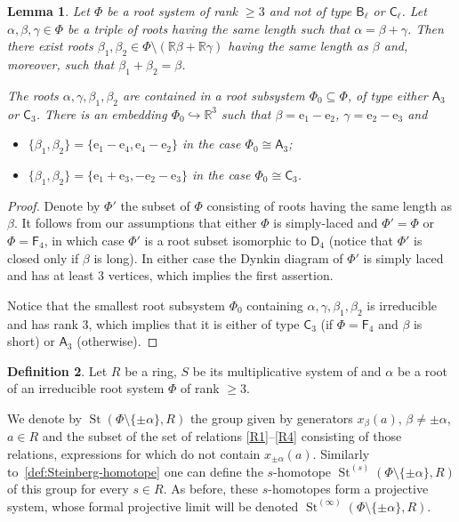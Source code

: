 \documentclass{article}
\numberwithin{equation}{section}
\newtheorem{lemma}{Lemma} \numberwithin{lemma}{section}
\theoremstyle{definition}
\newtheorem{df}[lemma]{Definition} \Crefname{df}{Definition}{Definitions}
\theoremstyle{remark}
\DeclareMathOperator\St{St}
\newcommand{\rA}{\mathsf{A}}
\newcommand{\rB}{\mathsf{B}}
\newcommand{\rC}{\mathsf{C}}
\newcommand{\rD}{\mathsf{D}}
\newcommand{\rF}{\mathsf{F}}
\begin{document}
\begin{lemma}\label{ThreeRoots}
Let \(\Phi\) be a root system of rank \(\geq 3\) and not of type \(\rB_\ell\) or \(\rC_\ell\). Let \(\alpha, \beta, \gamma \in \Phi\) be a triple of roots having the same length such that $\alpha = \beta + \gamma$.  
Then there exist roots \(\beta_1, \beta_2 \in \Phi \setminus (\mathbb R\beta + \mathbb R\gamma)\) having the same length as $\beta$ and, moreover, such that \(\beta_1 + \beta_2 = \beta\).

The roots $\alpha, \gamma, \beta_1, \beta_2$ are contained in a root subsystem $\Phi_0 \subseteq \Phi$, of type either \(\rA_3\) or \(\rC_3\). There is an embedding \(\Phi_0 \hookrightarrow  \mathbb R^3\) such that \(\beta = \mathrm e_1 - \mathrm e_2\), \(\gamma = \mathrm e_2 - \mathrm e_3\) and 
\begin{itemize}
 \item \(\{\beta_1, \beta_2\} = \{\mathrm e_1 - \mathrm e_4, \mathrm e_4 - \mathrm e_2\}\) in the case \(\Phi_0\cong\rA_3\);
 \item \(\{\beta_1, \beta_2\} = \{\mathrm e_1 + \mathrm e_3, -\mathrm e_2 - \mathrm e_3\}\) in the case \(\Phi_0\cong\rC_3\).
\end{itemize}
\end{lemma}
\begin{proof}
Denote by $\Phi'$ the subset of $\Phi$ consisting of roots having the same length as $\beta$.
It follows from our assumptions that either $\Phi$ is simply-laced and $\Phi' = \Phi$ or $\Phi = \rF_4$, in which case $\Phi'$ is a root subset isomorphic to $\rD_4$ (notice that $\Phi'$ is closed only if $\beta$ is long). In either case the Dynkin diagram of $\Phi'$ is simply laced and has at least $3$ vertices, which implies the first assertion.

Notice that the smallest root subsystem $\Phi_0$ containing $\alpha, \gamma, \beta_1, \beta_2$ is irreducible and has rank $3$, which implies that it is either of type  $\rC_3$ (if $\Phi = \rF_4$ and $\beta$ is short) or $\rA_3$ (otherwise). \end{proof}

\begin{df}
Let $R$ be a ring, $S$ be its multiplicative system of and $\alpha$ be a root of an irreducible root system $\Phi$ of rank $\geq 3$. 

We denote by $\St(\Phi\setminus\{\pm \alpha\}, R)$ the group given by generators $x_\beta(a)$, $\beta \neq \pm \alpha$, $a\in R$ and the subset of the set of relations \eqref{R1}--\eqref{R4} consisting of those relations, expressions for which do not contain $x_{\pm\alpha}(a)$.
Similarly to~\cref{def:Steinberg-homotope} one can define the $s$-homotope $\St^{(s)}(\Phi\setminus\{\pm \alpha\}, R)$ of this group for every $s\in R$. 
As before, these $s$-homotopes form a projective system, whose formal projective limit will be denoted $\St^{(\infty)}(\Phi \setminus\{\pm \alpha\}, R)$. 
\end{df}
\end{document}
